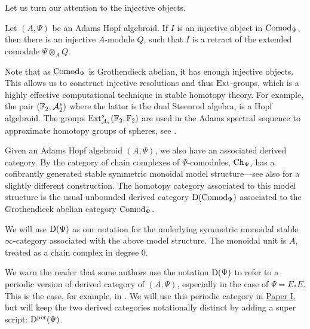 Let us turn our attention to the injective objects. 

\begin{proposition}
    \label{ch0:rm:injective-comodules}
    Let $(A, \Psi)$ be an Adams Hopf algebroid. If $I$ is an injective object in $\mathrm{Comod}_\Psi$, then there is an injective $A$-module $Q$, such that $I$ is a retract of the extended comodule $\Psi\otimes_A Q$. 
\end{proposition}

\begin{remark}
    Note that as $\mathrm{Comod}_{\Psi}$ is Grothendieck abelian, it has enough injective objects. This allows us to construct injective resolutions and thus $\operatorname{Ext}$-groups, which is a highly effective computational technique in stable homotopy theory. For example, the pair $(\mathbb{F}_2, \mathcal{A}_2^*)$ where the latter is the dual Steenrod algebra, is a Hopf algebroid. The groups $\operatorname{Ext}^s_{\mathcal{A}_*}(\mathbb{F}_2, \mathbb{F}_2)$ are used in the Adams spectral sequence to approximate homotopy groups of spheres, see \cite{adams_58}. 
\end{remark}

Given an Adams Hopf algebroid $(A, \Psi)$, we also have an associated derived category. By \cite[2.1.2, 2.1.3]{hovey_04} the category of chain complexes of $\Psi$-comodules, $\mathrm{Ch}_\Psi$, has a cofibrantly generated stable symmetric monoidal model structure---see also \cite{barnes-roitzheim_2011} for a slightly different construction. The homotopy category associated to this model structure is the usual unbounded derived category $\mathrm{D}(\mathrm{Comod}_\Psi)$ associated to the Grothendieck abelian category $\mathrm{Comod}_\Psi$. 

\begin{notation}
    We will use $\mathrm{D}(\Psi)$ as our notation for the underlying symmetric monoidal stable $\infty$-category associated with the above model structure. The monoidal unit is $A$, treated as a chain complex in degree $0$.
\end{notation}

\begin{remark}
    We warn the reader that some authors use the notation $\mathrm{D}(\Psi)$ to refer to a periodic version of derived category of $(A, \Psi)$, especially in the case of $\Psi = E_*E$. This is the case, for example, in \cite{pstragowski_2021}. We will use this periodic category in \hyperref[ch1]{Paper I}, but will keep the two derived categories notationally distinct by adding a super script: $\mathrm{D}^{\mathrm{per}}(\Psi)$. 
\end{remark}

